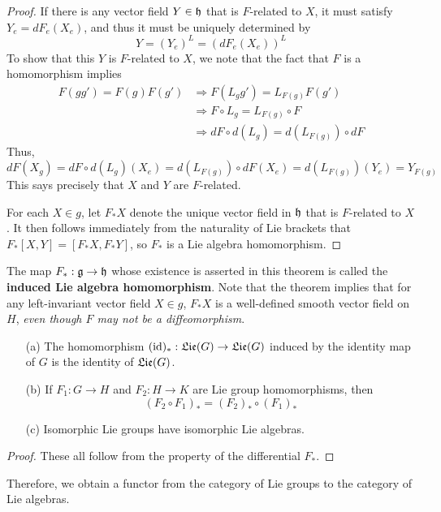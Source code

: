 \begin{proof}
If there is any vector field $Y\in\mathfrak{h}$ that is $F$-related to $X$, it must satisfy $Y_e=dF_e(X_e)$, and thus it must be uniquely determined by
\[Y=(Y_e)^L=(dF_e(X_e))^L\]
To show that this $Y$ is $F$-related to $X$, we note that the fact that $F$ is a homomorphism implies
\begin{align*}
F(gg')=F(g)F(g')&\Rightarrow F(L_gg')=L_{F(g)}F(g')\\
&\Rightarrow F\circ L_g=L_{F(g)}\circ F\\
&\Rightarrow dF\circ d(L_g)=d(L_{F(g)})\circ dF
\end{align*}
Thus,
\[dF(X_g)=dF\circ d(L_g)(X_e)=d(L_{F(g)})\circ dF(X_e)=d(L_{F(g)})(Y_e)=Y_{F(g)}\]
This says precisely that $X$ and $Y$ are $F$-related.\par
For each $X\in g$, let $F_*X$ denote the unique vector field in $\mathfrak{h}$ that is $F$-related to $X$. It then follows immediately from the naturality of Lie brackets that $F_*[X,Y]=[F_*X,F_*Y]$, so $F_*$ is a Lie algebra homomorphism.
\end{proof}
The map $F_*:\mathfrak{g}\to\mathfrak{h}$ whose existence is asserted in this theorem is called the \textbf{induced Lie algebra homomorphism}. Note that the theorem implies that for any left-invariant vector field $X\in g$, $F_*X$ is a well-defined smooth vector field on $H$, \textit{even though $F$ may not be a diffeomorphism}.
\begin{proposition}
\mbox{}
\begin{itemize}
\item[(a)] The homomorphism $(\mathrm{id})_*:\mathfrak{Lie}(G)\to\mathfrak{Lie}(G)$ induced by the identity map of $G$ is the identity of $\mathfrak{Lie}(G)$.
\item[(b)] If $F_1:G\to H$ and $F_2:H\to K$ are Lie group homomorphisms, then
\[(F_2\circ F_1)_*=(F_2)_*\circ(F_1)_*\]
\item[(c)] Isomorphic Lie groups have isomorphic Lie algebras.
\end{itemize}
\end{proposition}
\begin{proof}
These all follow from the property of the differential $F_*$.
\end{proof}
Therefore, we obtain a functor from the category of Lie groups to the category of Lie algebras. 
